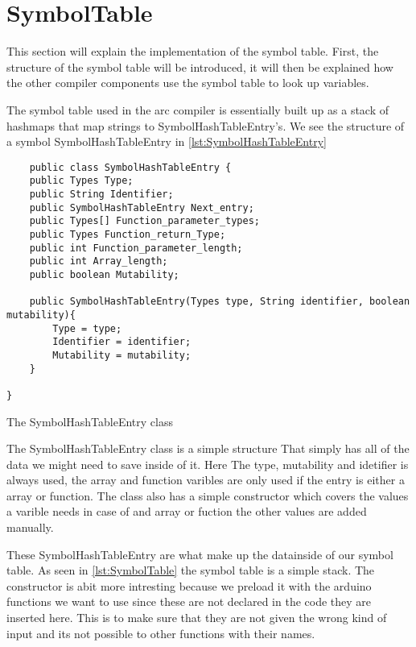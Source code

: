 \section{SymbolTable}

This section will explain the implementation of the symbol table. First, the structure of
the symbol table will be introduced, it will then be explained how the other
compiler components use the symbol table to look up variables.

The symbol table used in the arc compiler is essentially built up as a stack of hashmaps that map strings to SymbolHashTableEntry's. We see the structure of a symbol SymbolHashTableEntry in \ref{lst:SymbolHashTableEntry}


\begin{listing}[htb!]
    \begin{verbatim}
    public class SymbolHashTableEntry {
    public Types Type;
    public String Identifier;
    public SymbolHashTableEntry Next_entry;
    public Types[] Function_parameter_types;
    public Types Function_return_Type;
    public int Function_parameter_length;
    public int Array_length;
    public boolean Mutability;

    public SymbolHashTableEntry(Types type, String identifier, boolean mutability){
        Type = type;
        Identifier = identifier;
        Mutability = mutability;
    }
    
}
\end{verbatim}
\caption{The SymbolHashTableEntry class}
\label{lst:SymbolHashTableEntry}
\end{listing}

The SymbolHashTableEntry class is a simple structure That simply has all of the data we might need to save inside of it. Here The type, mutability and idetifier is always used, the array and function varibles are only used if the entry is either a array or function. The class also has a simple constructor which covers the values a varible needs in case of and array or fuction the other values are added manually.


These SymbolHashTableEntry are what make up the datainside of our symbol table. As seen in \ref{lst:SymbolTable} the symbol table is  a simple stack. The constructor is abit more intresting because we preload it with the arduino functions we want to use since these are not declared in the code they are inserted here. This is to make sure that they are not given the wrong kind of input and its not possible to other functions with their names.

